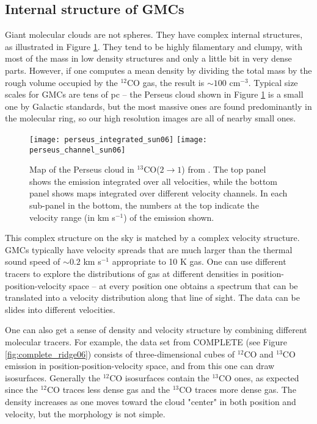 \subsection{Internal structure of GMCs}

Giant molecular clouds are not spheres. They have complex internal structures, as illustrated in Figure \ref{fig:perseus_sun06}. They tend to be highly filamentary and clumpy, with most of the mass in low density structures and only a little bit in very dense parts. However, if one computes a mean density by dividing the total mass by the rough volume occupied by the $^{12}$CO gas, the result is $\sim 100$ cm$^{-3}$. Typical size scales for GMCs are tens of pc -- the Perseus cloud shown in Figure \ref{fig:perseus_sun06} is a small one by Galactic standards, but the most massive ones are found predominantly in the molecular ring, so our high resolution images are all of nearby small ones.

\begin{figure}
\texttt{[image: perseus\_integrated\_sun06]}
\texttt{[image: perseus\_channel\_sun06]}
\caption[$^{13}$CO($2\rightarrow 1$) maps of Perseus]{
\label{fig:perseus_sun06}
Map of the Perseus cloud in $^{13}$CO($2\rightarrow 1$) from \citet{sun06a}. The top panel shows the emission integrated over all velocities, while the bottom panel shows maps integrated over different velocity channels. In each sub-panel in the bottom, the numbers at the top indicate the velocity range (in km s$^{-1}$) of the emission shown.
}
\end{figure}

This complex structure on the sky is matched by a complex velocity structure. GMCs typically have velocity spreads that are much larger than the thermal sound speed of $\sim 0.2$ km s$^{-1}$ appropriate to 10 K gas. One can use different tracers to explore the distributions of gas at different densities in position-position-velocity space -- at every position one obtains a spectrum that can be translated into a velocity distribution along that line of sight. The data can be slides into different velocities.

One can also get a sense of density and velocity structure by combining different molecular tracers. For example, the data set from COMPLETE (see Figure \ref{fig:complete_ridge06}) consists of three-dimensional cubes of $^{12}$CO and $^{13}$CO emission in position-position-velocity space, and from this one can draw isosurfaces. Generally the $^{12}$CO isosurfaces contain the $^{13}$CO ones, as expected since the $^{12}$CO traces less dense gas and the $^{13}$CO traces more dense gas. The density increases as one moves toward the cloud "center" in both position and velocity, but the morphology is not simple.   

